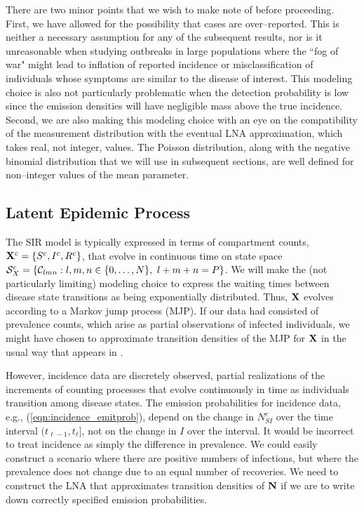There are two minor points that we wish to make note of before proceeding. First, we have allowed for the possibility that cases are over--reported. This is neither a necessary assumption for any of the subsequent results, nor is it unreasonable when studying outbreaks in large populations where the ``fog of war" might lead to inflation of reported incidence or misclassification of individuals whose symptoms are similar to the disease of interest. This modeling choice is also not particularly problematic when the detection probability is low since the emission densities will have negligible mass above the true incidence. Second, we are also making this modeling choice with an eye on the compatibility of the measurement distribution with the eventual LNA approximation, which takes real, not integer, values. The Poisson distribution, along with the negative binomial distribution that we will use in subsequent sections, are well defined for non--integer values of the mean parameter. 

\subsection{Latent Epidemic Process}
\label{subsec:lna_epid_proc}

The SIR model is typically expressed in terms of compartment counts, $ \mathbf{X}^c = \lbrace S^c,I^c,R^c\rbrace $, that evolve in continuous time on state space $ \mathcal{S}_X^c = \left \lbrace \mathcal{C}_{lmn}:l,m,n\in\lbrace0,\dots,N\rbrace,\ l+m+n=P\right \rbrace $. We will make the (not particularly limiting) modeling choice to express the waiting times between disease state transitions as being exponentially distributed. Thus, $ \mathbf{X} $ evolves according to a Markov jump process (MJP). If our data had consisted of prevalence counts, which arise as partial observations of infected individuals, we might have chosen to approximate transition densities of the MJP for $ \mathbf{X} $ in the usual way that appears in \cite{komorowski2009,fearnhead2014}. 

However, incidence data are discretely observed, partial realizations of the increments of counting processes that evolve continuously in time as individuals transition among disease states. The emission probabilities for incidence data, e.g., (\ref{eqn:incidence_emitprob}), depend on the change in $ N_{SI}^c $ over the time interval $ (t_{\ell-1},t_\ell] $, not on the change in $ I $ over the interval. It would be incorrect to treat incidence as simply the difference in prevalence. We could easily construct a scenario where there are positive numbers of infections, but where the prevalence does not change due to an equal number of recoveries. We need to construct the LNA that approximates transition densities of $ \mathbf{N} $ if we are to write down correctly specified emission probabilities.

